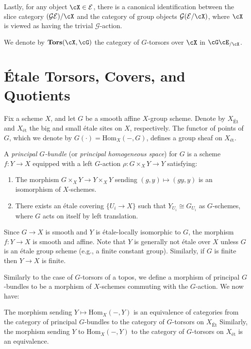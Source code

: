 Lastly, for any object $\cX \in \mathcal{E}$, there is a canonical identification between the slice category
$(\mathcal{G}\mathcal{E})/\cX$ and the category of group objects $\mathcal{G}(\mathcal{E}/\cX)$, where $\cX$ is viewed as having the 
trivial $\mathcal{G}$-action.

We denote by $\mathbf{Tors}(\cX, \cG)$ the category of $G$-torsors over $\cX$ in $\cG \cE_{/\cX}$.

\section{\'Etale Torsors, Covers, and Quotients}
Fix a scheme $X$, and let $G$ be a smooth affine $X$-group scheme. 
Denote by $X_{\text{Ét}}$ and $X_{\text{ét}}$ the big and small étale sites on $X$, respectively. 
The functor of points of $G$, which we denote by $G(\cdot) = \mathrm{Hom}_X(-, G)$, defines a group sheaf on 
$X_{\text{ét}}$.

\begin{definition} A \textit{principal $G$-bundle} (or \textit{principal homogeneous space}) for $G$ is a 
scheme $f : Y \to X$ equipped with a left $G$-action $\rho: G \times_X Y \to Y$ satisfying:
\begin{enumerate}
    \item The morphism $G \times_X Y \to Y \times_X Y$ sending $(g, y) \mapsto (gy, y)$ is an isomorphism of $X$-schemes.
    \item There exists an étale covering $\{U_i \to X\}$ such that $Y_{U_i} \cong G_{U_i}$ as $G$-schemes, 
    where $G$ acts on itself by left translation.
\end{enumerate}
\end{definition}

\begin{rem*}
    Since $G \to X$ is smooth and $Y$ is étale-locally isomorphic to $G$, 
    the morphism $f: Y \to X$ is smooth and affine. Note that $Y$ is generally not étale over $X$ unless $G$ is an 
    étale group scheme (e.g., a finite constant group).
    Similarly, if $G$ is finite then $Y \to X$ is finite.
\end{rem*}

Similarly to the case of $G$-torsors of a topos, we define a morphism of principal $G$-bundles to be a morphism of $X$-schemes commuting with the
$G$-action. We now have:

\begin{theorem}\label{theorem:torsors_are_realized_as_spaces}
    The morphism sending $Y \mapsto \mathrm{Hom}_X(-, Y)$ is an equivalence of categories from the category of principal $G$-bundles 
    to the category of $G$-torsors on $X_{\text{\'Et}}$
    Similarly, the morphism sending $Y$ to $\mathrm{Hom}_X(-, Y)$ to the category of $G$-torsors on $X_{\text{ét}}$ is an equivalence.
\end{theorem}

